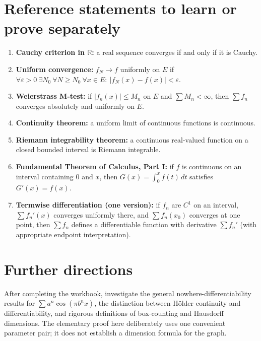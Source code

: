 \documentclass{workbook}
\newcommand{\R}{\mathbb R}
\begin{document}
\section{Reference statements to learn or prove separately}
\begin{enumerate}[leftmargin=*]
\item \textbf{Cauchy criterion in $\R$:} a real sequence converges if and only if it is Cauchy.
\item \textbf{Uniform convergence:} $f_N\to f$ uniformly on $E$ if $\forall\varepsilon>0\ \exists N_0\ \forall N\geq N_0\ \forall x\in E:\ |f_N(x)-f(x)|<\varepsilon$.
\item \textbf{Weierstrass M-test:} if $|f_n(x)|\leq M_n$ on $E$ and $\sum M_n<\infty$, then $\sum f_n$ converges absolutely and uniformly on $E$.
\item \textbf{Continuity theorem:} a uniform limit of continuous functions is continuous.
\item \textbf{Riemann integrability theorem:} a continuous real-valued function on a closed bounded interval is Riemann integrable.
\item \textbf{Fundamental Theorem of Calculus, Part I:} if $f$ is continuous on an interval containing $0$ and $x$, then $G(x)=\int_0^x f(t)\,dt$ satisfies $G'(x)=f(x)$.
\item \textbf{Termwise differentiation (one version):} if $f_n$ are $C^1$ on an interval, $\sum f_n'(x)$ converges uniformly there, and $\sum f_n(x_0)$ converges at one point, then $\sum f_n$ defines a differentiable function with derivative $\sum f_n'$ (with appropriate endpoint interpretation).
\end{enumerate}

\section*{Further directions}
After completing the workbook, investigate the general nowhere-differentiability results for $\sum a^n\cos(\pi b^n x)$, the distinction between H\"older continuity and differentiability, and rigorous definitions of box-counting and Hausdorff dimensions. The elementary proof here deliberately uses one convenient parameter pair; it does not establish a dimension formula for the graph.
\end{document}
